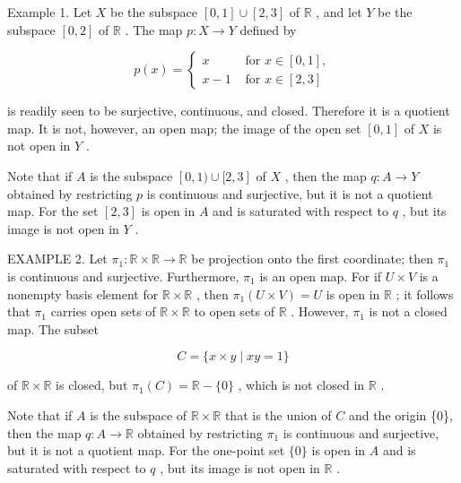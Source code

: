 \documentclass[10pt]{article}
\begin{document}
Example 1. Let \(X\) be the subspace \(\left\lbrack  {0,1}\right\rbrack   \cup  \left\lbrack  {2,3}\right\rbrack\) of \(\mathbb{R}\) , and let \(Y\) be the subspace \(\left\lbrack  {0,2}\right\rbrack\) of \(\mathbb{R}\) . The map \(p : X \rightarrow  Y\) defined by

\[
p\left( x\right)  = \left\{  \begin{array}{ll} x & \text{ for }x \in  \left\lbrack  {0,1}\right\rbrack  , \\  x - 1 & \text{ for }x \in  \left\lbrack  {2,3}\right\rbrack   \end{array}\right.
\]

is readily seen to be surjective, continuous, and closed. Therefore it is a quotient map. It is not, however, an open map; the image of the open set \(\left\lbrack  {0,1}\right\rbrack\) of \(X\) is not open in \(Y\) .

Note that if \(A\) is the subspace \(\left\lbrack  {0,1)\cup \lbrack 2,3}\right\rbrack\) of \(X\) , then the map \(q : A \rightarrow  Y\) obtained by restricting \(p\) is continuous and surjective, but it is not a quotient map. For the set \(\left\lbrack  {2,3}\right\rbrack\) is open in \(A\) and is saturated with respect to \(q\) , but its image is not open in \(Y\) .

EXAMPLE 2. Let \({\pi }_{1} : \mathbb{R} \times  \mathbb{R} \rightarrow  \mathbb{R}\) be projection onto the first coordinate; then \({\pi }_{1}\) is continuous and surjective. Furthermore, \({\pi }_{1}\) is an open map. For if \(U \times  V\) is a nonempty basis element for \(\mathbb{R} \times  \mathbb{R}\) , then \({\pi }_{1}\left( {U \times  V}\right)  = U\) is open in \(\mathbb{R}\) ; it follows that \({\pi }_{1}\) carries open sets of \(\mathbb{R} \times  \mathbb{R}\) to open sets of \(\mathbb{R}\) . However, \({\pi }_{1}\) is not a closed map. The subset

\[
C = \{ x \times  y \mid  {xy} = 1\}
\]

of \(\mathbb{R} \times  \mathbb{R}\) is closed, but \({\pi }_{1}\left( C\right)  = \mathbb{R} - \{ 0\}\) , which is not closed in \(\mathbb{R}\) .

Note that if \(A\) is the subspace of \(\mathbb{R} \times  \mathbb{R}\) that is the union of \(C\) and the origin \{0\}, then the map \(q : A \rightarrow  \mathbb{R}\) obtained by restricting \({\pi }_{1}\) is continuous and surjective, but it is not a quotient map. For the one-point set \(\{ 0\}\) is open in \(A\) and is saturated with respect to \(q\) , but its image is not open in \(\mathbb{R}\) .
\end{document}
